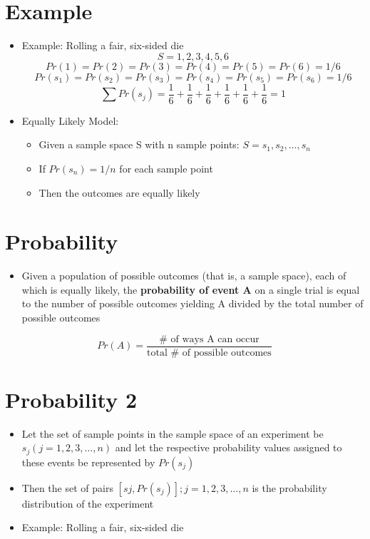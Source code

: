 \documentclass[12pt]{article}
\begin{document}
\section{Example}\label{example}

\begin{itemize}
\item
  Example: Rolling a fair, six-sided die \[S = {1, 2, 3, 4, 5, 6}\]
  \[Pr(1) = Pr(2) = Pr(3) = Pr(4) = Pr(5) = Pr(6) = 1/6\]
  \[Pr(s_{1}) = Pr(s_{2}) = Pr(s_{3}) = Pr(s_{4}) = Pr(s_{5}) = Pr(s_{6}) = 1/6\]
  \[\sum Pr(s_{j}) = \frac{1}{6} + \frac{1}{6} + \frac{1}{6} + \frac{1}{6} + \frac{1}{6} + \frac{1}{6} = 1\]
\item
  Equally Likely Model:

  \begin{itemize}
  \itemsep1pt\parskip0pt
  \item
    Given a sample space S with n sample points:
    \(S = {s_{1}, s_{2}, \ldots, s_{n}}\)
  \item
    If \(Pr(s_{n}) = 1/n\) for each sample point
  \item
    Then the outcomes are equally likely
  \end{itemize}
\end{itemize}

\section{Probability}\label{probability}

\begin{itemize}
\itemsep1pt\parskip0pt
\item
  Given a population of possible outcomes (that is, a sample space),
  each of which is equally likely, the \textbf{probability of event A}
  on a single trial is equal to the number of possible outcomes yielding
  A divided by the total number of possible outcomes
\end{itemize}

\[Pr(A) = \frac{\mbox{# of ways A can occur}}{\mbox{total # of possible outcomes}}\]

\section{Probability 2}\label{probability-2}

\begin{itemize}
\item
  Let the set of sample points in the sample space of an experiment be
  \(s_{j}(j = 1, 2, 3, \ldots, n)\) and let the respective probability
  values assigned to these events be represented by \(Pr(s_{j})\)
\item
  Then the set of pairs \({[sj , Pr(s_{j})]; j = 1, 2, 3, \ldots, n}\)
  is the probability distribution of the experiment
\item
  Example: Rolling a fair, six-sided die
\end{itemize}
\end{document}
